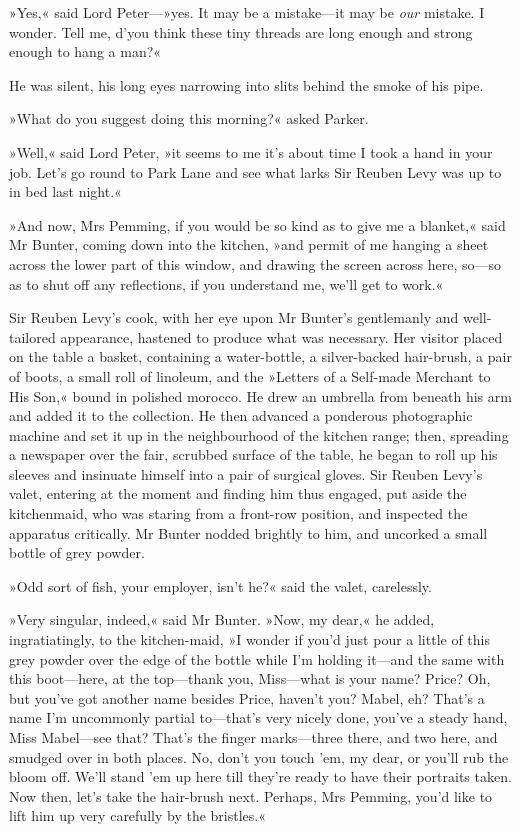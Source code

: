 »Yes,« said Lord Peter---»yes. It may be a mistake\allowbreak---\allowbreak it may be \textit{our} mistake. I wonder. Tell me, d'you think these tiny threads are long enough and strong enough to hang a man?«

He was silent, his long eyes narrowing into slits behind the smoke of his pipe.

»What do you suggest doing this morning?« asked Parker.

»Well,« said Lord Peter, »it seems to me it's about time I took a hand in your job. Let's go round to Park Lane and see what larks Sir Reuben Levy was up to in bed last night.«

»And now, Mrs Pemming, if you would be so kind as to give me a blanket,« said Mr Bunter, coming down into the kitchen, »and permit of me hanging a sheet across the lower part of this window, and drawing the screen across here, so\allowbreak---\allowbreak so as to shut off any reflections, if you understand me, we'll get to work.«

Sir Reuben Levy's cook, with her eye upon Mr Bunter's gentlemanly and well-tailored appearance, hastened to produce what was necessary. Her visitor placed on the table a basket, containing a water-bottle, a silver-backed hair-brush, a pair of boots, a small roll of linoleum, and the »Letters of a Self-made Merchant to His Son,« bound in polished morocco. He drew an umbrella from beneath his arm and added it to the collection. He then advanced a ponderous photographic machine and set it up in the neighbourhood of the kitchen range; then, spreading a newspaper over the fair, scrubbed surface of the table, he began to roll up his sleeves and insinuate himself into a pair of surgical gloves. Sir Reuben Levy's valet, entering at the moment and finding him thus engaged, put aside the kitchenmaid, who was staring from a front-row position, and inspected the apparatus critically. Mr Bunter nodded brightly to him, and uncorked a small bottle of grey powder.

»Odd sort of fish, your employer, isn't he?« said the valet, carelessly.

»Very singular, indeed,« said Mr Bunter. »Now, my dear,« he added, ingratiatingly, to the kitchen-maid, »I wonder if you'd just pour a little of this grey powder over the edge of the bottle while I'm holding it\allowbreak---\allowbreak and the same with this boot\allowbreak---\allowbreak here, at the top\allowbreak---\allowbreak thank you, Miss\allowbreak---\allowbreak what is your name? Price? Oh, but you've got another name besides Price, haven't you? Mabel, eh? That's a name I'm uncommonly partial to\allowbreak---\allowbreak that's very nicely done, you've a steady hand, Miss Mabel\allowbreak---\allowbreak see that? That's the finger marks\allowbreak---\allowbreak three there, and two here, and smudged over in both places. No, don't you touch 'em, my dear, or you'll rub the bloom off. We'll stand 'em up here till they're ready to have their portraits taken. Now then, let's take the hair-brush next. Perhaps, Mrs Pemming, you'd like to lift him up very carefully by the bristles.«

